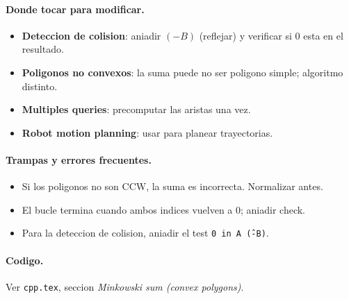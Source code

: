 \paragraph{Donde tocar para modificar.}
\begin{itemize}\setlength\itemsep{0pt}
	\item \textbf{Deteccion de colision}: aniadir $(-B)$ (reflejar) y verificar si $0$ esta en el resultado.
	\item \textbf{Poligonos no convexos}: la suma puede no ser poligono simple; algoritmo distinto.
	\item \textbf{Multiples queries}: precomputar las aristas una vez.
	\item \textbf{Robot motion planning}: usar para planear trayectorias.
\end{itemize}

\paragraph{Trampas y errores frecuentes.}
\begin{itemize}\setlength\itemsep{0pt}
	\item Si los poligonos no son CCW, la suma es incorrecta. Normalizar antes.
	\item El bucle termina cuando ambos indices vuelven a 0; aniadir check.
	\item Para la deteccion de colision, aniadir el test \texttt{0 in A \^ (-B)}.
\end{itemize}

\paragraph{Codigo.}
Ver \texttt{cpp.tex}, seccion \textit{Minkowski sum (convex polygons)}.

